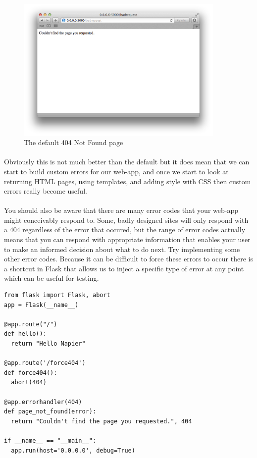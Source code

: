 \documentclass[12pt, a4paper, twoside]{book}
\begin{document}
\begin{figure}[H]
\centering
\includegraphics[width=0.9\textwidth]{images/flask-404-text.png}
\caption{The default 404 Not Found page}
\label{fig:flask-404-text}
\end{figure}

\paragraph{} Obviously this is not much better than the default but it does mean that we can start to build custom errors for our web-app, and once we start to look at returning HTML pages, using templates, and adding style with CSS then custom errors really become useful.

\paragraph{} You should also be aware that there are many error codes that your web-app might conceivably respond to. Some, badly designed sites will only respond with a 404 regardless of the error that occured, but the range of error codes actually means that you can respond with appropriate information that enables your user to make an informed decision about what to do next. Try implementing some other error codes. Because it can be difficult to force these errors to occur there is a shortcut in Flask that allows us to inject a specific type of error at any point which can be useful for testing.

\begin{lstlisting}
from flask import Flask, abort
app = Flask(__name__)

@app.route("/")
def hello():
  return "Hello Napier"

@app.route('/force404')
def force404():
  abort(404)

@app.errorhandler(404)
def page_not_found(error):
  return "Couldn't find the page you requested.", 404

if __name__ == "__main__":
  app.run(host='0.0.0.0', debug=True)
\end{lstlisting}
\end{document}
